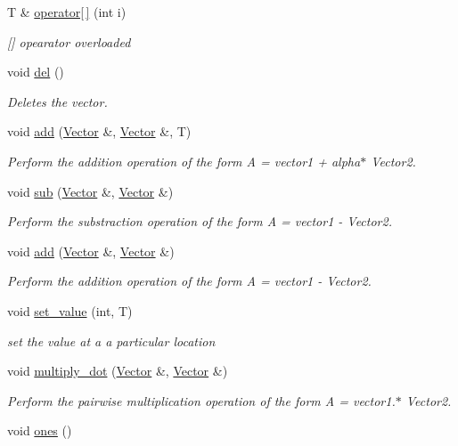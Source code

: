 \begin{DoxyCompactItemize}
T \& \hyperlink{class_vector_ada36811f9a98443820d1ebea0e36a429}{operator\mbox{[}$\,$\mbox{]}} (int i)
\begin{DoxyCompactList}\small\item\em \mbox{[}\mbox{]} opearator overloaded \end{DoxyCompactList}\item 
void \hyperlink{class_vector_a466ca7da1c0dcc2aaa61ceab5b725930}{del} ()
\begin{DoxyCompactList}\small\item\em Deletes the vector. \end{DoxyCompactList}\item 
void \hyperlink{class_vector_a93af0ecdf122aa1303550d1c7f0396ae}{add} (\hyperlink{class_vector}{Vector} \&, \hyperlink{class_vector}{Vector} \&, T)
\begin{DoxyCompactList}\small\item\em Perform the addition operation of the form A = vector1 + alpha$\ast$ Vector2. \end{DoxyCompactList}\item 
void \hyperlink{class_vector_a5149e97157d953073c6e5d4fa93f986d}{sub} (\hyperlink{class_vector}{Vector} \&, \hyperlink{class_vector}{Vector} \&)
\begin{DoxyCompactList}\small\item\em Perform the substraction operation of the form A = vector1 -\/ Vector2. \end{DoxyCompactList}\item 
void \hyperlink{class_vector_a383f11d918ea6d7b98f1f1349438eaef}{add} (\hyperlink{class_vector}{Vector} \&, \hyperlink{class_vector}{Vector} \&)
\begin{DoxyCompactList}\small\item\em Perform the addition operation of the form A = vector1 -\/ Vector2. \end{DoxyCompactList}\item 
void \hyperlink{class_vector_a18bcec2aa0b570722d5c59e6ba24d7db}{set\+\_\+value} (int, T)
\begin{DoxyCompactList}\small\item\em set the value at a a particular location \end{DoxyCompactList}\item 
void \hyperlink{class_vector_a000d3d2daf69f5c3feb2e8ce4de4c4f0}{multiply\+\_\+dot} (\hyperlink{class_vector}{Vector} \&, \hyperlink{class_vector}{Vector} \&)
\begin{DoxyCompactList}\small\item\em Perform the pairwise multiplication operation of the form A = vector1.$\ast$ Vector2. \end{DoxyCompactList}\item 
void \hyperlink{class_vector_ade18a68062f38bf5f83a041e96fe9e77}{ones} ()
\end{DoxyCompactItemize}
